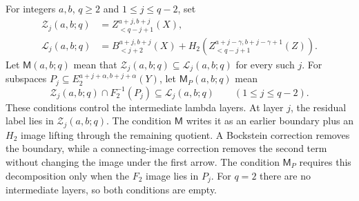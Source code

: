 For integers $a,b$, $q\ge2$ and $1\le j\le q-2$, set
\[
\begin{aligned}
\mathcal Z_j(a,b;q)&=Z_{<q-j+1}^{a+j,b+j}(X),\\
\mathcal L_j(a,b;q)&=B_{<j+2}^{a+j,b+j}(X)
 +H_2\!\left(Z_{<q-j+1}^{a+j-\gamma,b+j-\gamma+1}(Z)\right).
\end{aligned}
\]
Let $\mathsf M(a,b;q)$ mean that
$\mathcal Z_j(a,b;q)\subseteq\mathcal L_j(a,b;q)$ for every such $j$.
For subspaces $P_j\subseteq E_2^{a+j+\alpha,b+j+\alpha}(Y)$,
let $\mathsf M_P(a,b;q)$ mean
\[
\mathcal Z_j(a,b;q)\cap F_2^{-1}(P_j)
 \subseteq\mathcal L_j(a,b;q)
\qquad(1\le j\le q-2).
\]
These conditions control the intermediate lambda layers. At layer $j$,
the residual label lies in $\mathcal Z_j(a,b;q)$.
The condition $\mathsf M$ writes it as an earlier boundary plus an
$H_2$ image lifting through the remaining quotient. A Bockstein
correction removes the boundary, while a connecting-image correction
removes the second term without changing the image under the first
arrow. The condition $\mathsf M_P$ requires this decomposition only
when the $F_2$ image lies in $P_j$.
For $q=2$ there are no intermediate layers, so both conditions are empty.

